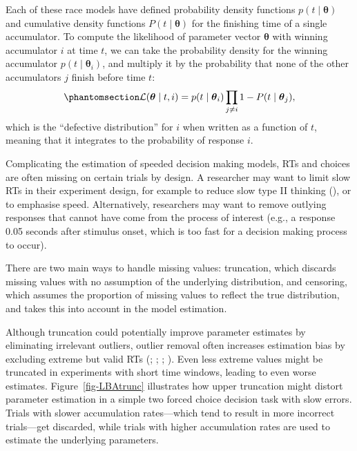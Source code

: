 \documentclass[
  stu,
  longtable,
  nolmodern,
  notxfonts,
  notimes,
  draftfirst,
  colorlinks=true,linkcolor=blue,citecolor=blue,urlcolor=blue]{apa7}
\begin{document}
Each of these race models have defined probability density functions
\(p(t \mid \boldsymbol{\theta})\) and cumulative density functions
\(P(t \mid \boldsymbol{\theta})\) for the finishing time of a single
accumulator. To compute the likelihood of parameter vector
\(\boldsymbol{\theta}\) with winning accumulator \(i\) at time \(t\), we
can take the probability density for the winning accumulator
\(p(t \mid \boldsymbol{\theta}_{i})\), and multiply it by the
probability that none of the other accumulators \(j\) finish before time
\(t\): \begin{equation}\phantomsection\label{eq-race-likelihood}{
\mathcal{L}(\boldsymbol{\theta} \mid t, i) = p(t \mid \boldsymbol{\theta}_{i}) \prod_{j \neq i}{1 - P(t \mid \boldsymbol{\theta}_{j})},
}\end{equation} which is the ``defective distribution'' for \(i\) when
written as a function of \(t\), meaning that it integrates to the
probability of response \(i\).

Complicating the estimation of speeded decision making models, RTs and
choices are often missing on certain trials by design. A researcher may
want to limit slow RTs in their experiment design, for example to reduce
slow type II thinking (), or to
emphasise speed. Alternatively, researchers may want to remove outlying
responses that cannot have come from the process of interest (e.g., a
response 0.05 seconds after stimulus onset, which is too fast for a
decision making process to occur).

There are two main ways to handle missing values: truncation, which
discards missing values with no assumption of the underlying
distribution, and censoring, which assumes the proportion of missing
values to reflect the true distribution, and takes this into account in
the model estimation.

Although truncation could potentially improve parameter estimates by
eliminating irrelevant outliers, outlier removal often increases
estimation bias by excluding extreme but valid RTs
(;
;
;
). Even less extreme
values might be truncated in experiments with short time windows,
leading to even worse estimates. Figure~\ref{fig-LBAtrunc} illustrates
how upper truncation might distort parameter estimation in a simple two
forced choice decision task with slow errors. Trials with slower
accumulation rates---which tend to result in more incorrect trials---get
discarded, while trials with higher accumulation rates are used to
estimate the underlying parameters.
\end{document}

